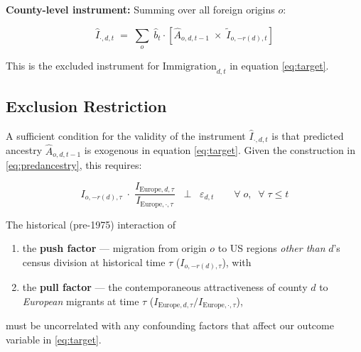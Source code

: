 \bigskip
\noindent\textbf{County-level instrument:} Summing over all foreign origins $o$:

\begin{equation}\label{eq:instrument}
\boxed{\hat{I}_{\cdot,d,t} \;=\; \sum_{o}\; \hat{b}_t \cdot \left[\hat{A}_{o,d,t-1} \;\times\; \tilde{I}_{o,-r(d),t}\right]}
\end{equation}

\noindent This is the excluded instrument for $\text{Immigration}_{d,t}$ in equation \eqref{eq:target}.
\subsection{Exclusion Restriction}

A sufficient condition for the validity of the instrument $\hat{I}_{\cdot,d,t}$ is that predicted ancestry $\hat{A}_{o,d,t-1}$ is exogenous in equation \eqref{eq:target}. Given the construction in \eqref{eq:predancestry}, this requires:

\begin{equation}\label{eq:exclusion}
\boxed{I_{o,-r(d),\tau}\;\cdot\;\frac{I_{\text{Europe},d,\tau}}{I_{\text{Europe},\cdot,\tau}} \;\;\perp\;\; \varepsilon_{d,t} \qquad \forall\; o,\;\; \forall\; \tau \leq t}
\end{equation}

\bigskip
\noindent The historical (pre-1975) interaction of
\begin{enumerate}
    \item the \textbf{push factor} --- migration from origin $o$ to US regions \emph{other than} $d$'s census division at historical time $\tau$ ($I_{o,-r(d),\tau}$), with
    \item the \textbf{pull factor} --- the contemporaneous attractiveness of county $d$ to \emph{European} migrants at time $\tau$ ($I_{\text{Europe},d,\tau}/I_{\text{Europe},\cdot,\tau}$),
\end{enumerate}
must be uncorrelated with any confounding factors that affect our outcome variable in \eqref{eq:target}.

